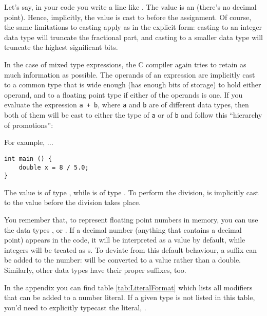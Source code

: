 {Let's say, in your code you write a line like . The value  is an  (there's no decimal point). Hence, implicitly, the value  is cast to  before the assignment. Of course, the same limitations to casting apply as in the explicit form: casting to an integer data type will truncate the fractional part, and casting to a smaller data type will truncate the highest significant bits.

In the case of mixed type expressions, the C compiler again tries to retain as much information as possible. The operands of an expression are implicitly cast to a common type that is wide enough (has enough bits of storage) to hold either operand, and to a floating point type if either of the operands is one. If you evaluate the expression \texttt{a + b}, where \texttt{a} and \texttt{b} are of different data types, then both of them will be cast to either the type of \texttt{a} or of \texttt{b} and follow this \enquote{hierarchy of promotions}:
\begin{center}
\end{center}

For example, ...
\begin{codebox}
\begin{verbatim}
int main () {
    double x = 8 / 5.0;
}
\end{verbatim}
\end{codebox}

The value  is of type , while  is of type . To perform the division,  is implicitly cast to the  value  before the division takes place.

\begin{plusbox}
You remember that, to represent floating point numbers in memory, you can use the data types ,  or . If a decimal number (anything that contains a decimal point) appears in the code, it will be interpreted as a  value by default, while integers will be treated as s. To deviate from this default behaviour, a suffix can be added to the number:  will be converted to a  value rather than a double. Similarly, other data types have their proper suffixes, too.

In the appendix you can find table \ref{tab:LiteralFormat} which lists all modifiers that can be added to a number literal. If a given type is not listed in this table, you'd need to explicitly typecast the literal, \eg {}.
\end{plusbox}

}
